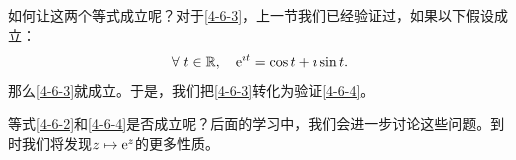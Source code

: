 \documentclass[12pt,UTF8]{ctexbook}
\begin{document}
\begin{so}
    如何让这两个等式成立呢？对于\eqref{4-6-3}，上一节我们已经验证过，如果以下假设成立：
    \begin{equation}
        \forall \; t\in\mathbb{R}, \quad \mathrm{e}^{\imath t} = \cos{t} + \imath \sin{t}. \label{4-6-4}
    \end{equation}
    那么\eqref{4-6-3}就成立。于是，我们把\eqref{4-6-3}转化为验证\eqref{4-6-4}。


    等式\eqref{4-6-2}和\eqref{4-6-4}是否成立呢？后面的学习中，我们会进一步讨论这些问题。到时我们将发现$z \mapsto \mathrm{e}^z$的更多性质。
\end{so}
\end{document}
